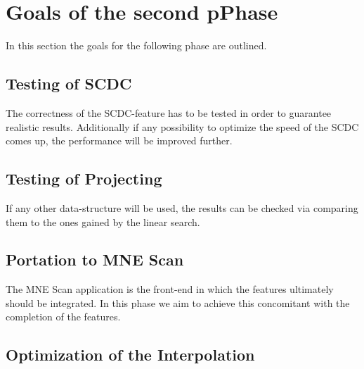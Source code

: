 \section{Goals of the second pPhase}
In this section the goals for the following phase are outlined. 

\subsection{Testing of SCDC}
The correctness of the SCDC-feature has to be tested in order to guarantee realistic results. Additionally if any possibility to optimize the speed of the SCDC comes up, the performance will be improved further.
\subsection{Testing of Projecting}
If any other data-structure will be used, the results can be checked via comparing them to the ones gained by the linear search.
\subsection{Portation to MNE Scan}
The MNE Scan application is the front-end in which the features ultimately should be integrated. In this phase we aim to achieve this concomitant with the completion of the features.
\subsection{Optimization of the Interpolation}